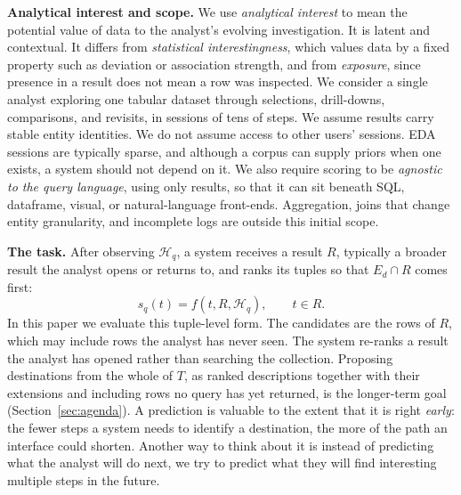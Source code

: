 \documentclass[sigconf]{acmart}
\begin{document}
\textbf{Analytical interest and scope.}
We use \emph{analytical interest} to mean the potential value of data to the analyst's evolving investigation. It is latent and contextual. It differs from \emph{statistical interestingness}, which values data by a fixed property such as deviation or association strength, and from \emph{exposure}, since presence in a result does not mean a row was inspected. We consider a single analyst exploring one tabular dataset through selections, drill-downs, comparisons, and revisits, in sessions of tens of steps. We assume results carry stable entity identities. We do not assume access to other users' sessions. EDA sessions are typically sparse, and although a corpus can supply priors when one exists, a system should not depend on it. We also require scoring to be \emph{agnostic to the query language}, using only results, so that it can sit beneath SQL, dataframe, visual, or natural-language front-ends. Aggregation, joins that change entity granularity, and incomplete logs are outside this initial scope.

\textbf{The task.}
After observing $\mathcal{H}_q$, a system receives a result $R$, typically a broader result the analyst opens or returns to, and ranks its tuples so that $E_d\cap R$ comes first:
\begin{equation}
  s_q(t)=f(t,R,\mathcal{H}_q),\qquad t\in R.
  \label{eq:task}
\end{equation}
In this paper we evaluate this tuple-level form. The candidates are the rows of $R$, which may include rows the analyst has never seen. The system re-ranks a result the analyst has opened rather than searching the collection. Proposing destinations from the whole of $T$, as ranked descriptions together with their extensions and including rows no query has yet returned, is the longer-term goal (Section~\ref{sec:agenda}). A prediction is valuable to the extent that it is right \emph{early}: the fewer steps a system needs to identify a destination, the more of the path an interface could shorten. Another way to think about it is instead of predicting what the analyst will do next, we try to predict what they will find interesting multiple steps in the future.
\end{document}
